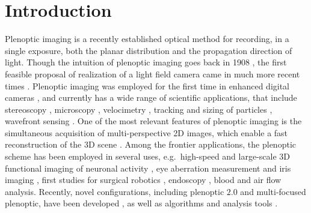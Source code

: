 \documentclass[aps,pra,amssymb,twocolumn,amsmath,superscriptaddress,showpacs,10pt]{revtex4-1}
\begin{document}
\section{Introduction}

Plenoptic imaging is a recently established optical method for recording, in a single exposure, both the planar distribution and the propagation direction of light. Though the intuition of plenoptic imaging goes back in 1908 \cite{lippmann}, the first feasible proposal of realization of a light field camera came in much more recent times \cite{adelson}. Plenoptic imaging was employed for the first time in enhanced digital cameras \cite{website,ng}, and currently has a wide range of scientific applications, that include stereoscopy \cite{adelson,muenzel,levoy}, microscopy \cite{microscopy1,microscopy2,microscopy3,microscopy4}, velocimetry \cite{piv}, tracking and sizing of particles \cite{tracking}, wavefront sensing \cite{thesis_wu,eye,atmosphere1,atmosphere2}. One of the most relevant features of plenoptic imaging is the simultaneous acquisition of multi-perspective 2D images, which enable a fast reconstruction of the 3D scene \cite{3dimaging}. Among the frontier applications, the plenoptic scheme has been employed in several uses, e.g.\ high-speed and large-scale 3D functional imaging of neuronal activity \cite{microscopy4}, eye aberration measurement and iris imaging \cite{eye,eye2}, first studies for surgical robotics \cite{surgery}, endoscopy \cite{endoscopy}, blood \cite{piv2} and air flow \cite{airflow1,airflow2} analysis. Recently, novel configurations, including plenoptic $2.0$ and multi-focused plenoptic, have been developed \cite{focused_pleno,multifocused_pleno,plenoptic_review, georgiev2009high,jin2017point}, as well as algorithms and analysis tools \cite{dansereau2013decoding,perez2014super,li2016scalable}.
\end{document}
